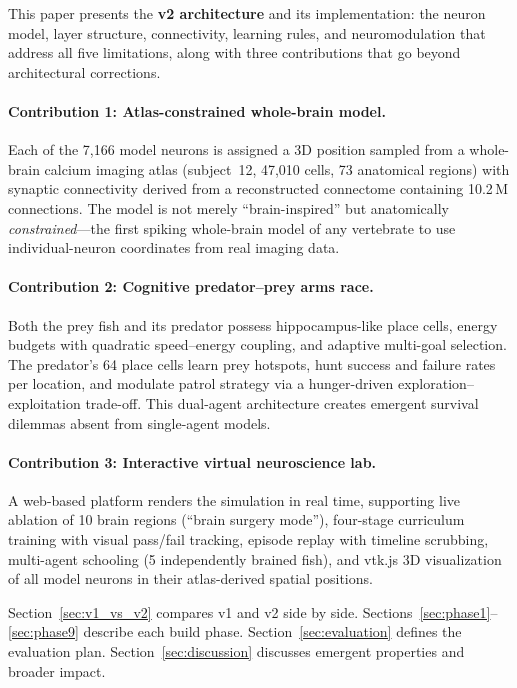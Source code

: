 \documentclass[11pt,a4paper]{article}
\begin{document}
This paper presents the \textbf{v2 architecture} and its implementation:
the neuron model, layer structure, connectivity, learning rules, and
neuromodulation that address all five limitations, along with three
contributions that go beyond architectural corrections.

\paragraph{Contribution 1: Atlas-constrained whole-brain model.}
Each of the 7,166 model neurons is assigned a 3D position sampled from a
whole-brain calcium imaging atlas (subject~12, 47,010 cells, 73 anatomical
regions) with synaptic connectivity derived from a reconstructed connectome
containing 10.2\,M connections. The model is not merely ``brain-inspired'' but
anatomically \emph{constrained}---the first spiking whole-brain model of any
vertebrate to use individual-neuron coordinates from real imaging data.

\paragraph{Contribution 2: Cognitive predator--prey arms race.}
Both the prey fish and its predator possess hippocampus-like place cells,
energy budgets with quadratic speed--energy coupling, and adaptive multi-goal
selection. The predator's 64 place cells learn prey hotspots, hunt success and
failure rates per location, and modulate patrol strategy via a hunger-driven
exploration--exploitation trade-off. This dual-agent architecture creates
emergent survival dilemmas absent from single-agent models.

\paragraph{Contribution 3: Interactive virtual neuroscience lab.}
A web-based platform renders the simulation in real time, supporting live
ablation of 10 brain regions (``brain surgery mode''), four-stage curriculum
training with visual pass/fail tracking, episode replay with timeline
scrubbing, multi-agent schooling (5 independently brained fish), and vtk.js
3D visualization of all model neurons in their atlas-derived spatial positions.

Section~\ref{sec:v1_vs_v2} compares v1 and v2 side by side.
Sections~\ref{sec:phase1}--\ref{sec:phase9} describe each build phase.
Section~\ref{sec:evaluation} defines the evaluation plan.
Section~\ref{sec:discussion} discusses emergent properties and broader impact.
\end{document}
